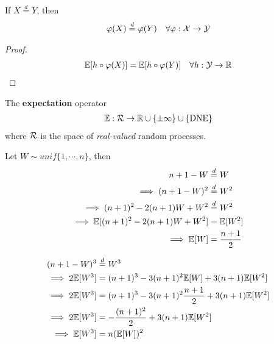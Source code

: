 \documentclass{article}
\begin{document}
   	\begin{theorem}[Invariance]
   		If $X \overset{d}{=} Y$, then 
   		\begin{align}
   			\varphi(X) \overset{d}{=} \varphi(Y)\quad \forall \varphi: \mathcal{{X}} \to \mathcal{{Y}}
   		\end{align}
   	\end{theorem}
   	\begin{proof}
   		\begin{align}
   			\mathbb{E}[{h \circ \varphi(X)}] = \mathbb{E}[{h \circ \varphi(Y)}]\quad \forall h: \mathcal{{Y}} \to \mathbb{R}
   		\end{align}
   	\end{proof}
   	
   	\begin{definition}
   		The \textbf{expectation} operator
   		\begin{align}
   			\mathbb{E}: \mathcal{{R}} \to \mathbb{R} \cup \{\pm\infty\} \cup \{ \text{{DNE}} \}
   		\end{align}
   		where $\mathcal{{R}}$ is the space of \emph{real-valued} random processes.
   	\end{definition}
   	
   	\begin{proposition}
   		Let $W \sim unif\{1, \cdots, n\}$, then
   		\begin{align}
   			n + 1 - W &\overset{d}{=} W \\
   			\implies (n + 1 - W)^2 &\overset{d}{=} W^2 \\
   			\implies (n+1)^2 - 2(n+1)W + W^2 &\overset{d}{=} W^2 \\
   			\implies \mathbb{E}[{(n+1)^2 - 2(n+1)W + W^2}] &= \mathbb{E}[{W^2}] \\
   			\implies \mathbb{E}[{W}] &= \frac{n+1}{2}
   		\end{align}
   	\end{proposition}
   	
   	\begin{proposition}
   		\begin{align}
   			(n+1-W)^3 &\overset{d}{=} W^3 \\
   			\implies 2 \mathbb{E}[{W^3}] &= (n+1)^3 - 3(n+1)^2 \mathbb{E}[{W}] + 3(n+1) \mathbb{E}[{W^2}] \\
   			\implies 2 \mathbb{E}[{W^3}] &= (n+1)^3 - 3(n+1)^2 \frac{n+1}{2} + 3(n+1) \mathbb{E}[{W^2}] \\
   			\implies 2 \mathbb{E}[{W^3}] &= - \frac{(n+1)^2}{2} + 3(n+1) \mathbb{E}[{W^2}] \\
   			\implies \mathbb{E}[{W^3}] &= n (\mathbb{E}[{W}])^2
   		\end{align}
   	\end{proposition}
   	
\end{document}
